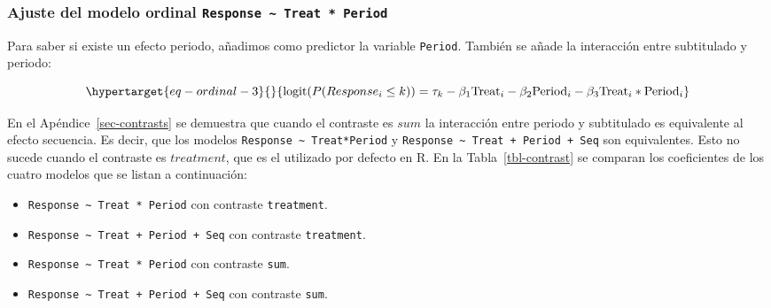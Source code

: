 \documentclass[
  12pt,
  a4paper,
  extrafontsizes,
  onecolumn,
  openright,
  table]{memoir}
\providecommand{\tightlist}{%
  \setlength{\itemsep}{0pt}\setlength{\parskip}{0pt}}\usepackage{longtable,booktabs,array}
\begin{document}
\hypertarget{sec-response-treat.period}{%
\subsubsection{\texorpdfstring{Ajuste del modelo ordinal
\texttt{Response\ \textasciitilde{}\ Treat\ *\ Period}}{Ajuste del modelo ordinal Response \textasciitilde{} Treat * Period}}\label{sec-response-treat.period}}

Para saber si existe un efecto periodo, añadimos como predictor la
variable \texttt{Period}. También se añade la interacción entre
subtitulado y periodo:

\small

\begin{equation}\protect\hypertarget{eq-ordinal-3}{}{
\text{logit}(P(Response_i \leq k)) = \tau_k - \beta_1 \text{Treat}_i - \beta_2 \text{Period}_i - \beta_3 \text{Treat}_i * \text{Period}_i
}\label{eq-ordinal-3}\end{equation}

\normalsize

En el Apéndice~\ref{sec-contrasts} se demuestra que cuando el contraste
es \(sum\) la interacción entre periodo y subtitulado es equivalente al
efecto secuencia. Es decir, que los modelos
\texttt{Response\ \textasciitilde{}\ Treat*Period} y
\texttt{Response\ \textasciitilde{}\ Treat\ +\ Period\ +\ Seq} son
equivalentes. Esto no sucede cuando el contraste es \(treatment\), que
es el utilizado por defecto en R. En la Tabla~\ref{tbl-contrast} se
comparan los coeficientes de los cuatro modelos que se listan a
continuación:

\begin{itemize}
\tightlist
\item
  \texttt{Response\ \textasciitilde{}\ Treat\ *\ Period} con contraste
  \texttt{treatment}.
\item
  \texttt{Response\ \textasciitilde{}\ Treat\ +\ Period\ +\ Seq} con
  contraste \texttt{treatment}.
\item
  \texttt{Response\ \textasciitilde{}\ Treat\ *\ Period} con contraste
  \texttt{sum}.
\item
  \texttt{Response\ \textasciitilde{}\ Treat\ +\ Period\ +\ Seq} con
  contraste \texttt{sum}.
\end{itemize}

\tiny
\end{document}
